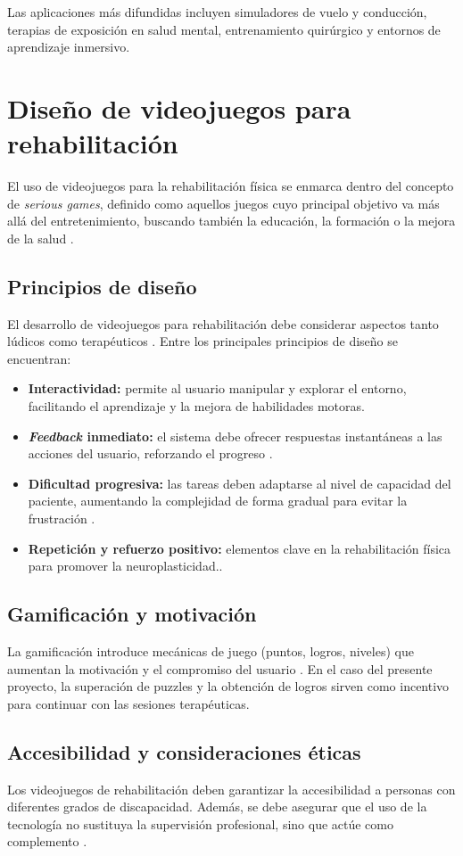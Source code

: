 Las aplicaciones más difundidas incluyen simuladores de vuelo y conducción, terapias de exposición en salud mental, entrenamiento quirúrgico y entornos de aprendizaje inmersivo.

\section{Diseño de videojuegos para rehabilitación}

El uso de videojuegos para la rehabilitación física se enmarca dentro del concepto de \textit{serious games}, definido como aquellos juegos cuyo principal objetivo va más allá del entretenimiento, buscando también la educación, la formación o la mejora de la salud \cite{david2016serious}.

\subsection{Principios de diseño}

El desarrollo de videojuegos para rehabilitación debe considerar aspectos tanto lúdicos como terapéuticos \cite{greene2016rehab}. Entre los principales principios de diseño se encuentran:

\begin{itemize}
    \item \textbf{Interactividad:} permite al usuario manipular y explorar el entorno, facilitando el aprendizaje y la mejora de habilidades motoras.
    \item \textbf{\textit{Feedback} inmediato:} el sistema debe ofrecer respuestas instantáneas a las acciones del usuario, reforzando el progreso \cite{cameirao2010impact}.
    \item \textbf{Dificultad progresiva:} las tareas deben adaptarse al nivel de capacidad del paciente, aumentando la complejidad de forma gradual para evitar la frustración \cite{zimmerli2012virtual}.
    \item \textbf{Repetición y refuerzo positivo:} elementos clave en la rehabilitación física para promover la neuroplasticidad.\cite{holden2005virtual}.
\end{itemize}

\subsection{Gamificación y motivación}

La gamificación introduce mecánicas de juego (puntos, logros, niveles) que aumentan la motivación y el compromiso del usuario \cite{sardi2017gamification}. En el caso del presente proyecto, la superación de puzzles y la obtención de logros sirven como incentivo para continuar con las sesiones terapéuticas.

\subsection{Accesibilidad y consideraciones éticas}

Los videojuegos de rehabilitación deben garantizar la accesibilidad a personas con diferentes grados de discapacidad. Además, se debe asegurar que el uso de la tecnología no sustituya la supervisión profesional, sino que actúe como complemento \cite{rodriguez2020reha}.
